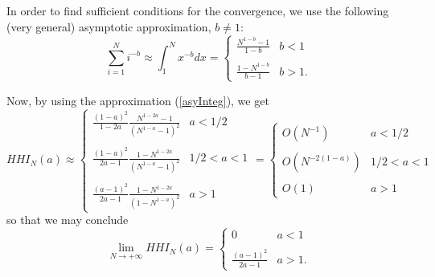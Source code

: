 \documentclass[preprint,12pt]{article}
\begin{document}
In order to find sufficient conditions for the convergence, we use the following (very general) asymptotic approximation, $b\neq 1$:
\begin{equation} \label{asyInteg}
\sum_{i=1}^N i^{-b} \approx \int_1^N x^{-b} dx = \left\{ \begin{array}{ll} \frac{N^{1-b}-1}{1-b} & b < 1 \\  \\ \frac{1- N^{1-b}}{b-1}  & b>1. \end{array} \right.
\end{equation}

Now, by using the approximation (\ref{asyInteg}), we get
$$
HHI_N(a) \approx \begin{cases} \frac{(1-a)^2}{1-2a} \frac{N^{1-2a} - 1}{(N^{1-a}-1)^2} & a <1/2 \\  \\
\frac{(1-a)^2}{2a-1}  \frac{1-N^{1-2a} }{(N^{1-a}-1)^2} &  1/2 < a < 1 \\ \\ 
\frac{(a-1)^2}{2a-1}  \frac{1-N^{1-2a} }{(1-N^{1-a})^2} &  a>1 
\end{cases}   = \begin{cases} O(N^{-1})        & a <1/2 \\  \\
                              O(N^{-2(1-a)}) &  1/2 < a < 1 \\ \\ 
                              O(1)                 &  a>1 
                \end{cases}                 
$$
so that we may conclude
\begin{equation}
\lim_{N\rightarrow + \infty} HHI_N(a) = \begin{cases} 0 & a <1 \\ \\  \frac{(a-1)^2}{2a-1}  & a > 1. \end{cases}
\end{equation}
\end{document}
